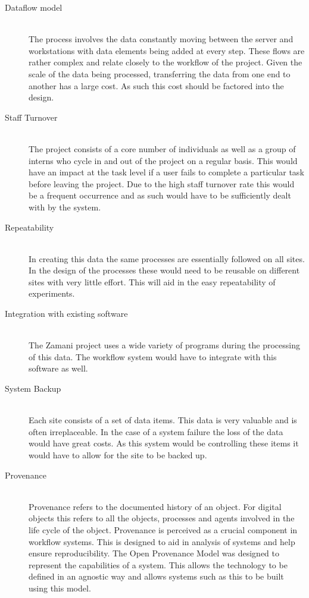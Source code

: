 \documentclass[12pt,a4paper]{report}
\begin{document}
\begin{description}
    \item[Dataflow model] \hfill \\
        The process involves the data constantly moving between the server
        and workstations with data elements being added at every step. These
        flows are rather complex and relate closely to the workflow of the
        project.  Given the scale of the data being processed, transferring the data
        from one end to another has a large cost. As such this cost should
        be factored into the design.


    \item[Staff Turnover] \hfill \\
        The project consists of a core number of individuals as well as
        a group of interns who cycle in and out of the project on a regular
        basis. This would have an impact at the task
        level if a user fails to complete a particular task before leaving
        the project. Due to the high staff turnover rate this would
        be a frequent occurrence and as such would have to be sufficiently
        dealt with by the system.

    \item[Repeatability] \hfill \\
        In creating this data the same processes are essentially followed
        on all sites. In the design of the processes these would need to
        be reusable on different sites with very little effort. This
        will aid in the easy repeatability of experiments.

    \item[Integration with existing software] \hfill \\
        The Zamani project uses a wide variety of programs during
        the processing of this data. The workflow system would have
	to integrate with this software as well.

    \item[System Backup] \hfill \\
        Each site consists of a set of data items. This data is very valuable
        and is often irreplaceable. In the case of a system failure
        the loss of the data would have great costs. As this system would
        be controlling these items it would have to allow for the site
        to be backed up.

    \item[Provenance] \hfill \\
        Provenance refers to the documented history of an object\cite{moreau2008open}. For
        digital objects this refers to all the objects, processes and agents
        involved in the life cycle of the object. Provenance is perceived as
        a crucial component in workflow systems. This is designed to aid in
        analysis of systems and help ensure reproducibility. The Open
        Provenance Model was designed to represent the capabilities of a system.
        This allows the technology to be defined in an agnostic way and
        allows systems such as this to be built using this model.


\end{description}
\end{document}
